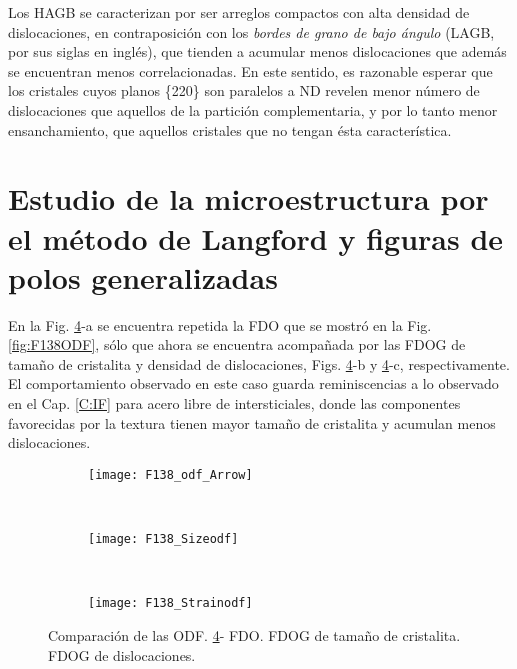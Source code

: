 Los HAGB se caracterizan por ser arreglos compactos con alta densidad de dislocaciones, en contraposición con los \textit{bordes de grano de bajo ángulo} (LAGB, por sus siglas en inglés), que tienden a acumular menos dislocaciones que además se encuentran menos correlacionadas.
En este sentido, es razonable esperar que los cristales cuyos planos \{220\} son paralelos a ND revelen menor número de dislocaciones que aquellos de la partición complementaria, y por lo tanto menor ensanchamiento, que aquellos cristales que no tengan ésta característica.

\newpage
\section{Estudio de la microestructura por el método de Langford y figuras de polos generalizadas}\label{S:F138LANG}
En la Fig. \ref{fig:F138ODFComp}-a se encuentra repetida la FDO que se mostró en la Fig. \ref{fig:F138ODF}, sólo que ahora se encuentra acompañada por las FDOG de tamaño de cristalita y densidad de dislocaciones, Figs. \ref{fig:F138ODFComp}-b y \ref{fig:F138ODFComp}-c, respectivamente.
El comportamiento observado en este caso guarda reminiscencias a lo observado en el Cap. \ref{C:IF} para acero libre de intersticiales, donde las componentes favorecidas por la textura tienen mayor tamaño de cristalita y acumulan menos dislocaciones.

\begin{figure}[!htb]
    \centering
    \begin{subfigure}[!htb]{0.965\textwidth}
        \texttt{[image: F138\_odf\_Arrow]}
        \caption{}
        \label{fig:F138ODFCompODF}
    \end{subfigure}
   \\ 
    \begin{subfigure}[!htb]{\textwidth}
        \texttt{[image: F138\_Sizeodf]}
        \caption{}
        \label{fig:F138ODFCompSizeODF}
    \end{subfigure}
   \\ 
    \begin{subfigure}[!htb]{\textwidth}
        \texttt{[image: F138\_Strainodf]}
        \caption{}
        \label{fig:F138ODFCompStrainODF}
    \end{subfigure}
    \caption{Comparación de las ODF. \ref{fig:F138ODFComp}- FDO.  FDOG de tamaño de cristalita.  FDOG de dislocaciones.}
    \label{fig:F138ODFComp}
\end{figure}

